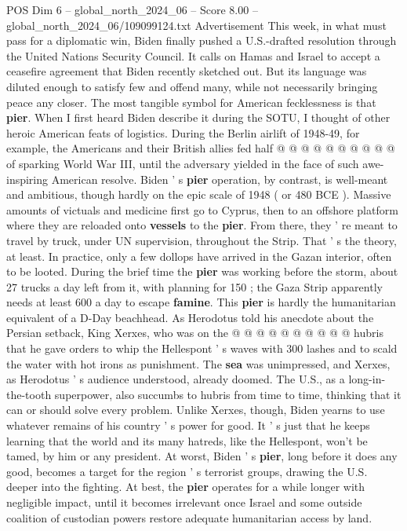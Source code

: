\begin{textsample}{POS Dim 6 – global\_north\_2024\_06 – Score 8.00 – global\_north\_2024\_06/109099124.txt}
Advertisement This week, in what must pass for a diplomatic win, Biden finally pushed a U.S.-drafted resolution through the United Nations Security Council.
It calls on Hamas and Israel to accept a ceasefire agreement that Biden recently sketched out.
But its language was diluted enough to satisfy few and offend many, while not necessarily bringing peace any closer.
The most tangible symbol for American fecklessness is that \textbf{pier}.
When I first heard Biden describe it during the SOTU, I thought of other heroic American feats of logistics.
During the Berlin airlift of 1948-49, for example, the Americans and their British allies fed half @ @ @ @ @ @ @ @ @ @ of sparking World War III, until the adversary yielded in the face of such awe-inspiring American resolve.
Biden ' s \textbf{pier} operation, by contrast, is well-meant and ambitious, though hardly on the epic scale of 1948 ( or 480 BCE ).
Massive amounts of victuals and medicine first go to Cyprus, then to an offshore platform where they are reloaded onto \textbf{vessels} to the \textbf{pier}.
From there, they ' re meant to travel by truck, under UN supervision, throughout the Strip.
That ' s the theory, at least.
In practice, only a few dollops have arrived in the Gazan interior, often to be looted.
During the brief time the \textbf{pier} was working before the storm, about 27 trucks a day left from it, with planning for 150 ; the Gaza Strip apparently needs at least 600 a day to escape \textbf{famine}.
This \textbf{pier} is hardly the humanitarian equivalent of a D-Day beachhead.
As Herodotus told his anecdote about the Persian setback, King Xerxes, who was on the @ @ @ @ @ @ @ @ @ @ hubris that he gave orders to whip the Hellespont ' s waves with 300 lashes and to scald the water with hot irons as punishment.
The \textbf{sea} was unimpressed, and Xerxes, as Herodotus ' s audience understood, already doomed.
The U.S., as a long-in-the-tooth superpower, also succumbs to hubris from time to time, thinking that it can or should solve every problem.
Unlike Xerxes, though, Biden yearns to use whatever remains of his country ' s power for good.
It ' s just that he keeps learning that the world and its many hatreds, like the Hellespont, won't be tamed, by him or any president.
At worst, Biden ' s \textbf{pier}, long before it does any good, becomes a target for the region ' s terrorist groups, drawing the U.S. deeper into the fighting.
At best, the \textbf{pier} operates for a while longer with negligible impact, until it becomes irrelevant once Israel and some outside coalition of custodian powers restore adequate humanitarian access by land.

\end{textsample}
